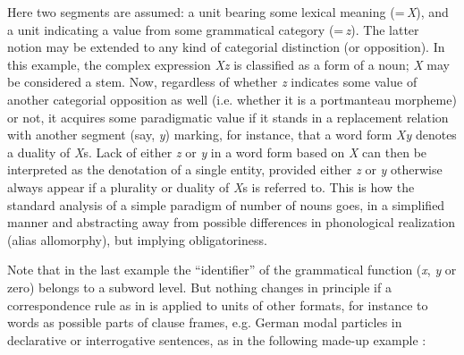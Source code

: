 \documentclass[output=paper]{langscibook}
\begin{document}

Here two segments are assumed: a unit bearing some lexical meaning (=\,\textit{X}), and a unit indicating a value from some grammatical category (=\,\textit{z}). The latter notion may be extended to any kind of categorial distinction (or opposition). In this example, the complex expression \textit{Xz} is classified as a form of a noun; \textit{X} may be considered a stem. Now, regardless of whether \textit{z} indicates some value of another categorial opposition as well (i.e. whether it is a portmanteau morpheme) or not, it acquires some paradigmatic value if it stands in a replacement relation with another segment (say, \textit{y}) marking, for instance, that a word form \textit{Xy} denotes a duality of \textit{X}s. Lack of either \textit{z} or \textit{y} in a word form based on \textit{X} can then be interpreted as the denotation of a single entity, provided either \textit{z} or \textit{y} otherwise always appear if a plurality or duality of \textit{X}s is referred to. This is how the standard analysis of a simple paradigm of number of nouns goes, in a simplified manner and abstracting away from possible differences in phonological realization (alias allomorphy), but implying obligatoriness.

Note that in the last example the “identifier” of the grammatical function (\textit{x}, \textit{y} or zero) belongs to a subword level. But nothing changes in principle if a correspondence rule as in  is applied to units of other formats, for instance to words as possible parts of clause frames, e.g. German modal particles in declarative or interrogative sentences, as in the following made-up example :
\end{document}

